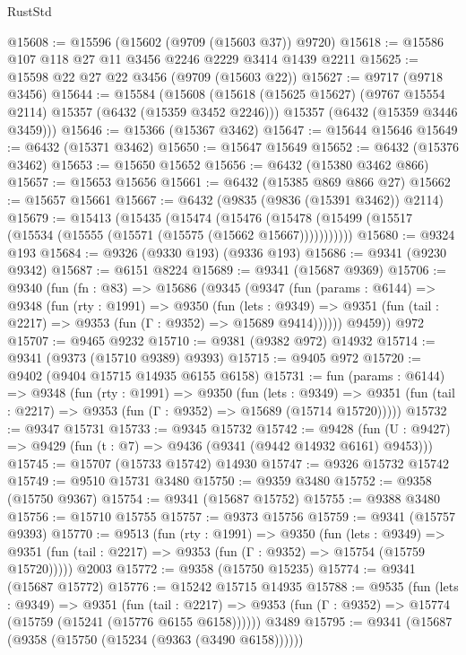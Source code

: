\begin{lexlean}{RustStd}
\begin{coremodule}
@15608 := @15596 (@15602 (@9709 (@15603 @37)) @9720)
@15618 := @15586 @107 @118 @27 @11 @3456 @2246 @2229 @3414 @1439 @2211
@15625 := @15598 @22 @27 @22 @3456 (@9709 (@15603 @22))
@15627 := @9717 (@9718 @3456)
@15644 := @15584
    (@15608
      (@15618 (@15625 @15627) (@9767 @15554 @2114) @15357 (@6432 (@15359 @3452 @2246)))
      @15357
      (@6432 (@15359 @3446 @3459)))
@15646 := @15366 (@15367 @3462)
@15647 := @15644 @15646
@15649 := @6432 (@15371 @3462)
@15650 := @15647 @15649
@15652 := @6432 (@15376 @3462)
@15653 := @15650 @15652
@15656 := @6432 (@15380 @3462 @866)
@15657 := @15653 @15656
@15661 := @6432 (@15385 @869 @866 @27)
@15662 := @15657 @15661
@15667 := @6432 (@9835 (@9836 (@15391 @3462)) @2114)
@15679 := @15413
    (@15435
      (@15474
        (@15476 (@15478 (@15499 (@15517 (@15534 (@15555 (@15571 (@15575 (@15662 @15667)))))))))))
@15680 := @9324 @193
@15684 := @9326 (@9330 @193) (@9336 @193)
@15686 := @9341 (@9230 @9342)
@15687 := @6151 @8224
@15689 := @9341 (@15687 @9369)
@15706 := @9340
    (fun (fn : @83) =>
    @15686
      (@9345
        (@9347
          (fun (params : @6144) =>
          @9348
            (fun (rty : @1991) =>
            @9350
              (fun (lets : @9349) =>
              @9351 (fun (tail : @2217) => @9353 (fun (Γ : @9352) => @15689 @9414))))))
        @9459))
    @972
@15707 := @9465 @9232
@15710 := @9381 (@9382 @972) @14932
@15714 := @9341 (@9373 (@15710 @9389) @9393)
@15715 := @9405 @972
@15720 := @9402 (@9404 @15715 @14935 @6155 @6158)
@15731 := fun (params : @6144) =>
  @9348
    (fun (rty : @1991) =>
    @9350
      (fun (lets : @9349) =>
      @9351 (fun (tail : @2217) => @9353 (fun (Γ : @9352) => @15689 (@15714 @15720)))))
@15732 := @9347 @15731
@15733 := @9345 @15732
@15742 := @9428
    (fun (U : @9427) => @9429 (fun (t : @7) => @9436 (@9341 (@9442 @14932 @6161) @9453)))
@15745 := @15707 (@15733 @15742) @14930
@15747 := @9326 @15732 @15742
@15749 := @9510 @15731 @3480
@15750 := @9359 @3480
@15752 := @9358 (@15750 @9367)
@15754 := @9341 (@15687 @15752)
@15755 := @9388 @3480
@15756 := @15710 @15755
@15757 := @9373 @15756
@15759 := @9341 (@15757 @9393)
@15770 := @9513
    (fun (rty : @1991) =>
    @9350
      (fun (lets : @9349) =>
      @9351 (fun (tail : @2217) => @9353 (fun (Γ : @9352) => @15754 (@15759 @15720)))))
    @2003
@15772 := @9358 (@15750 @15235)
@15774 := @9341 (@15687 @15772)
@15776 := @15242 @15715 @14935
@15788 := @9535
    (fun (lets : @9349) =>
    @9351
      (fun (tail : @2217) =>
      @9353 (fun (Γ : @9352) => @15774 (@15759 (@15241 (@15776 @6155 @6158))))))
    @3489
@15795 := @9341 (@15687 (@9358 (@15750 (@15234 (@9363 (@3490 @6158))))))

\end{coremodule}
\end{lexlean}
